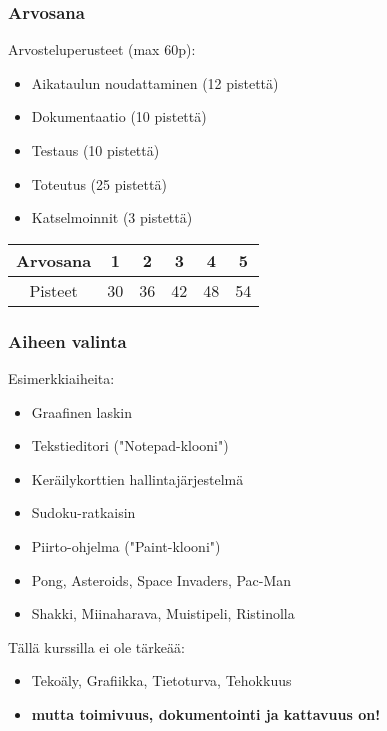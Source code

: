 \documentclass[finnish]{beamer}
\begin{document}
	\begin{frame}
		\frametitle{Arvosana}
		
		Arvosteluperusteet (max 60p):
		\begin{itemize}
			\item Aikataulun noudattaminen (12 pistettä)
			\item Dokumentaatio (10 pistettä)
			\item Testaus (10 pistettä)
			\item Toteutus (25 pistettä)
			\item Katselmoinnit (3 pistettä)
		\end{itemize}
		
		\begin{tabular}{|c|c|c|c|c|c|}
			\hline Arvosana & 1 & 2 & 3 & 4 & 5 \\ 
			\hline Pisteet & 30 & 36 & 42 & 48 & 54 \\ 
			\hline 
		\end{tabular} 
	\end{frame}
	
	\begin{frame}
		\frametitle{Aiheen valinta}
		
		Esimerkkiaiheita:
		\begin{itemize}
			\item Graafinen laskin
			\item Tekstieditori ("Notepad-klooni")
			\item Keräilykorttien hallintajärjestelmä
			\item Sudoku-ratkaisin
			\item Piirto-ohjelma ("Paint-klooni")
			\item Pong, Asteroids, Space Invaders, Pac-Man  
			\item Shakki, Miinaharava, Muistipeli, Ristinolla
		\end{itemize}
		
		Tällä kurssilla ei ole tärkeää:
		\begin{itemize}
			\item Tekoäly, Grafiikka, Tietoturva, Tehokkuus
			\item \textbf{mutta toimivuus, dokumentointi ja kattavuus on!}
		\end{itemize}
	\end{frame}
	
\end{document}
